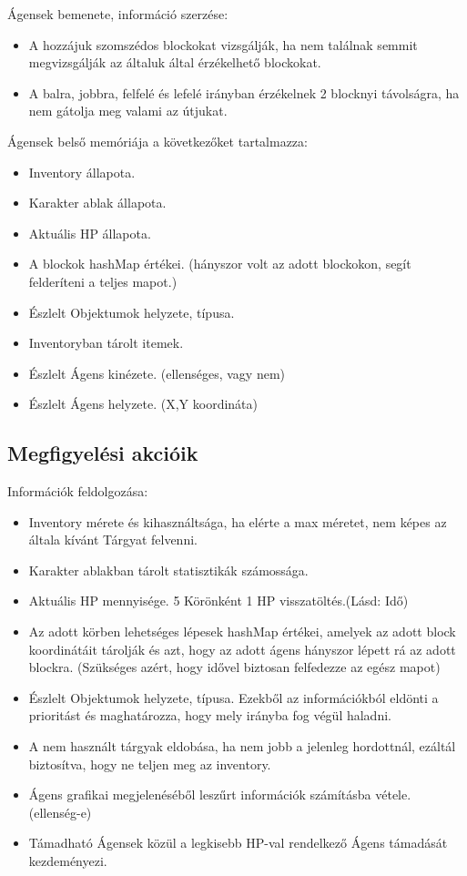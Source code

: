 Ágensek bemenete, információ szerzése:
\begin{itemize}
    \item A hozzájuk szomszédos blockokat vizsgálják, ha nem találnak semmit megvizsgálják az általuk által érzékelhető blockokat.
    \item A balra, jobbra, felfelé és lefelé irányban érzékelnek 2 blocknyi távolságra, ha nem gátolja meg valami az útjukat.
\end{itemize}

\noindent Ágensek belső memóriája a következőket tartalmazza:
\begin{itemize}
    \item Inventory állapota.
    \item Karakter ablak állapota.
    \item Aktuális HP állapota.
    \item A blockok hashMap értékei. (hányszor volt az adott blockokon, segít felderíteni a teljes mapot.)
    \item Észlelt Objektumok helyzete, típusa.
    \item Inventoryban tárolt itemek.
    \item Észlelt Ágens kinézete. (ellenséges, vagy nem)
    \item Észlelt Ágens helyzete. (X,Y koordináta)
\end{itemize}

\subsection{Megfigyelési akcióik}

\noindent Információk feldolgozása:
\begin{itemize}
    \item Inventory mérete és kihasználtsága, ha elérte a max méretet, nem képes az általa kívánt Tárgyat felvenni.
    \item Karakter ablakban tárolt statisztikák számossága.
    \item Aktuális HP mennyisége. 5 Körönként 1 HP visszatöltés.(Lásd: Idő)
    \item Az adott körben lehetséges lépesek hashMap értékei, amelyek az adott block koordinátáit tárolják és azt, hogy az adott ágens hányszor lépett rá az adott blockra. (Szükséges azért, hogy idővel biztosan felfedezze az egész mapot)
    \item Észlelt Objektumok helyzete, típusa. Ezekből az információkból eldönti a prioritást és maghatározza, hogy mely irányba fog végül haladni.
    \item A nem használt tárgyak eldobása, ha nem jobb a jelenleg hordottnál, ezáltál biztosítva, hogy ne teljen meg az inventory.
    \item Ágens grafikai megjelenéséből leszűrt információk számításba vétele. (ellenség-e)
    \item Támadható Ágensek közül a legkisebb HP-val rendelkező Ágens támadását kezdeményezi.
\end{itemize}

